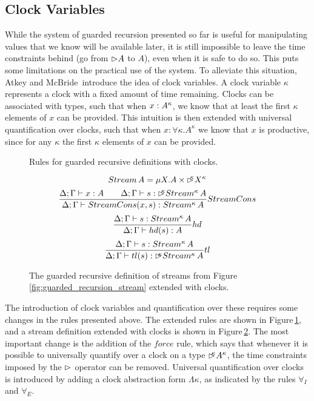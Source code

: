 \subsection{Clock Variables}
While the system of guarded recursion presented so far is useful for manipulating values that we know will be available later, it is still impossible to leave the time constraints behind (go from $\rhd A$ to $A$), even when it is safe to do so. This puts some limitations on the practical use of the system. To alleviate this situation, Atkey and McBride\,\citep{Atkey:2013} introduce the idea of clock variables. A clock variable $\kappa$ represents a clock with a fixed amount of time remaining. Clocks can be associated with types, such that when $x : A^\kappa$, we know that at least the first $\kappa$ elements of $x$ can be provided. This intuition is then extended with universal quantification over clocks, such that when $x : \forall\kappa. A^\kappa$ we know that $x$ is productive, since for any $\kappa$ the first $\kappa$ elements of $x$ can be provided. 
\begin{figure}







\caption{Rules for guarded recursive definitions with clocks.}
\label{fig:guarded_recursion_rules_clocks}
\end{figure}
\begin{figure}
\[
Stream\,A = \mu X. A \times \rhd^{\!\!\!\kappa}X^\kappa
\]
\[
\frac{\Delta;\Gamma\vdash x : A \quad \quad \Delta;\Gamma\vdash s : \rhd^{\!\!\!\kappa}Stream^\kappa\,A}{\Delta;\Gamma\vdash StreamCons(x,s) : Stream^\kappa\,A} StreamCons
\]
\[
\frac{\Delta;\Gamma\vdash s : Stream^\kappa\,A}{\Delta;\Gamma\vdash hd(s) : A} hd
\]
\[
\frac{\Delta;\Gamma\vdash s : Stream^\kappa\,A}{\Delta;\Gamma\vdash tl(s) : \rhd^{\!\!\!\kappa}Stream^\kappa\,A} tl
\]
\caption{The guarded recursive definition of streams from Figure\,\ref{fig:guarded_recursion_stream} extended with clocks.}
\label{fig:guarded_recursion_stream_clocks}
\end{figure}
The introduction of clock variables and quantification over these requires some changes in the rules presented above. The extended rules are shown in Figure\,\ref{fig:guarded_recursion_rules_clocks}, and a stream definition extended with clocks is shown in Figure\,\ref{fig:guarded_recursion_stream_clocks}. The most important change is the addition of the $force$ rule, which says that whenever it is possible to universally quantify over a clock on a type $\rhd^{\!\!\!\kappa}A^\kappa$, the time constraints imposed by the $\rhd$ operator can be removed. Universal quantification over clocks is introduced by adding a clock abstraction form $\Lambda\kappa$, as indicated by the rules $\forall_{I}$ and $\forall_{E}$.
